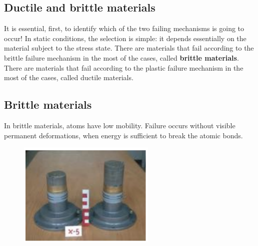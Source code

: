 \documentclass[class=report, crop=false, 12pt,a4paper]{standalone}
\begin{document}
\subsection{Ductile and brittle materials}
It is essential, first, to identify which of the two failing mechanisms is going to occur! In static conditions, the selection is simple: it depends essentially on the material subject to the stress state. There are materials that fail according to the brittle failure mechanism in the most of the cases, called \textbf{brittle materials}. There are materials that fail according to the plastic failure mechanism in the most of the cases, called ductile materials. 
\subsection{Brittle materials}
In brittle materials, atoms have low mobility. Failure occurs without visible permanent deformations, when energy is sufficient to break the atomic bonds.
\begin{figure}[H]
  \centering
  \includegraphics[height = 5cm]{../img/diagram9.png}
  \caption{}
\end{figure}
\end{document}
